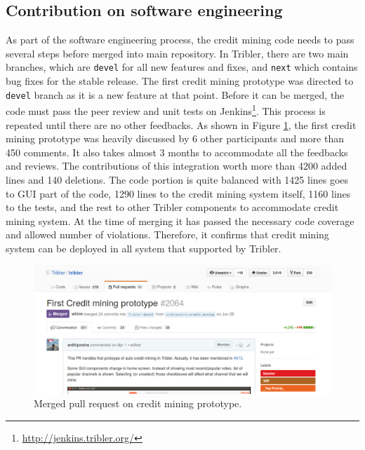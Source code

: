 \subsection{Contribution on software engineering}
As part of the software engineering process, the credit mining code needs to pass several steps before merged into main repository. In Tribler, there are two main branches, which are \texttt{devel} for all new features and fixes, and \texttt{next} which contains bug fixes for the stable release. The first credit mining prototype was directed to \texttt{devel} branch as it is a new feature at that point. Before it can be merged, the code must pass the peer review and unit tests on Jenkins\footnote{\url{http://jenkins.tribler.org/}}. This process is repeated until there are no other feedbacks. As shown in Figure \ref{fig:cmpullrequest}, the first credit mining prototype was heavily discussed by 6 other participants and more than 450 comments. It also takes almost 3 months to accommodate all the feedbacks and reviews. The contributions of this integration worth more than 4200 added lines and 140 deletions. The code portion is quite balanced with 1425 lines goes to GUI part of the code, 1290 lines to the credit mining system itself, 1160 lines to the tests, and the rest to other Tribler components to accommodate credit mining system. At the time of merging it has passed the necessary code coverage and allowed number of violations. Therefore, it confirms that credit mining system can be deployed in all system that supported by Tribler. 

\begin{figure}[h]
	\centering
	\includegraphics[width=\textwidth]{pics/cm_pr_crop.png}
	\caption[Merged pull request on credit mining prototype]{Merged pull request on credit mining prototype\footnotemark.}
	\label{fig:cmpullrequest}
\end{figure}

